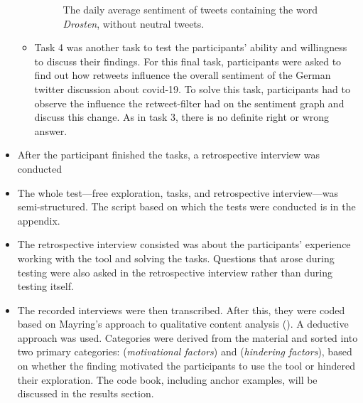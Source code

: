 \begin{itemize}
\begin{itemize}
        \begin{figure}[h!tb]
            \caption{The daily average sentiment of tweets containing the word \emph{Drosten}, without neutral tweets.}
            \label{fig:sentiment_drosten_noneutral}
        \end{figure}
        \item Task 4 was another task to test the participants' ability and willingness to discuss their findings. %
        For this final task, participants were asked to find out how retweets influence the overall sentiment of the German twitter discussion about covid-19. To solve this task, participants had to observe the influence the retweet-filter had on the sentiment graph and discuss this change. As in task 3, there is no definite right or wrong answer.
    \end{itemize}
    \item After the participant finished the tasks, a retrospective interview was conducted
    \item The whole test---free exploration, tasks, and retrospective interview---was semi-structured. The script based on which the tests were conducted is in the appendix.
    \item The retrospective interview consisted was about the participants' experience working with the tool and solving the tasks. Questions that arose during testing were also asked in the retrospective interview rather than during testing itself.
    \item The recorded interviews were then transcribed. After this, they were coded based on Mayring's approach to qualitative content analysis (\cite{mayring2010qualitative}). A deductive approach was used. Categories were derived from the material and sorted into two primary categories:  (\emph{motivational factors}) and  (\emph{hindering factors}), based on whether the finding motivated the participants to use the tool or hindered their exploration. The code book, including anchor examples, will be discussed in the results section.
\end{itemize}
